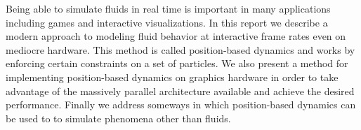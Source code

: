 Being able to simulate fluids in real time is important in many applications
including games and interactive visualizations. In this report we describe a
modern approach to modeling fluid behavior at interactive frame rates even on
mediocre hardware. This method is called position-based dynamics and works by
enforcing certain constraints on a set of particles. We also present a method
for implementing position-based dynamics on graphics hardware in order to take
advantage of the massively parallel architecture available and achieve the
desired performance. Finally we address someways in which position-based
dynamics can be used to to simulate phenomena other than fluids.

